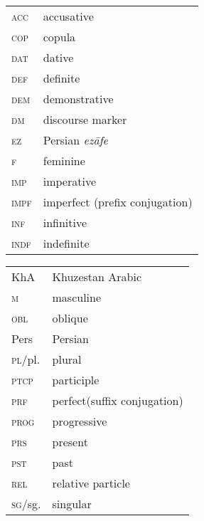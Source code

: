 \documentclass[output=paper,nonflat]{langsci/langscibook}
\begin{document}
\begin{tabularx}{.5\textwidth}{@{}lQ@{}}
\textsc{acc} & accusative\\
\textsc{cop} & copula\\
\textsc{dat} & dative\\
\textsc{def} & definite\\
\textsc{dem} & demonstrative\\
\textsc{dm} & discourse marker\\
\textsc{ez} & Persian \textit{ezāfe}\\
\textsc{f} & feminine\\
\textsc{imp} & imperative\\
\textsc{impf} & imperfect (prefix conjugation)\\
\textsc{inf} & infinitive\\
\textsc{indf} & indefinite\\
\end{tabularx}%
\begin{tabularx}{.5\textwidth}{@{}lQ@{}}
KhA & Khuzestan Arabic\\
\textsc{m} & masculine\\
\textsc{obl} & oblique\\
Pers & Persian\\
\textsc{pl}/pl. & plural\\
\textsc{ptcp} & participle\\
\textsc{prf} & perfect(suffix conjugation)\\
\textsc{prog} & progressive\\
\textsc{prs} & present\\
\textsc{pst} & past\\
\textsc{rel} & relative particle\\
\textsc{sg}/sg. & singular\\
\end{tabularx}%




\sloppy\printbibliography[heading=subbibliography,notkeyword=this]
\end{document}
